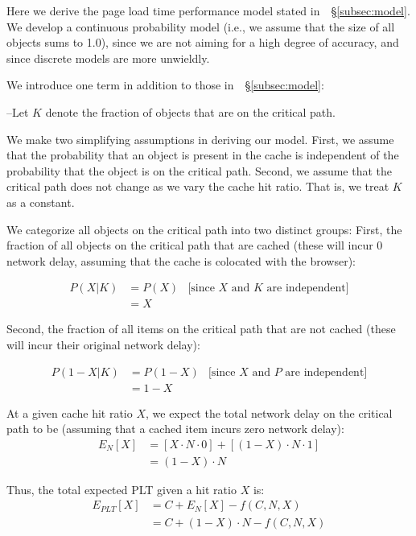 Here we derive the page load time performance model stated in~~\S\ref{subsec:model}. We
develop a continuous probability model (i.e., we assume that the size of all
objects sums to 1.0), since we are not aiming for a high degree of accuracy,
and since discrete models are more unwieldly.


We introduce one term in addition to those in~~\S\ref{subsec:model}:

\noindent--Let $K$ denote the fraction of objects that are on the critical path.

We make two simplifying assumptions in deriving our model. First, we assume that the probability that an
object is present in the cache is independent of the probability that the object is on the critical path.
Second, we assume that the critical path does not change as we vary the cache hit
ratio. That is, we treat $K$ as a constant.

We categorize all objects on the critical path into two distinct groups:
First, the fraction of all objects on the critical path that are cached (these
will incur 0 network delay, assuming that the cache is colocated with the
browser):

\begin{align*}
P(X|K) & =  P(X) & \text{[since $X$ and $K$ are independent]} \\
& = X &
\end{align*}

Second, the fraction of all items on the critical path that are not cached (these will incur their original network delay):

\begin{align*}
P(1-X | K) & = P(1-X) & \text{[since $X$ and $P$ are independent]} \\
& = 1-X &
\end{align*}

At a given cache hit ratio $X$, we expect the total network delay on the critical path to be (assuming that a cached item incurs zero network delay):
\begin{align*}
E_N[X] & = [X \cdot N \cdot 0] + [(1 - X) \cdot N \cdot 1] \\
& = (1 - X) \cdot N
\end{align*}

Thus, the total expected PLT given a hit ratio $X$ is:
\begin{align*}
E_{PLT}[X] & = C + E_N[X] - f(C,N,X) \\
& = C + (1 - X) \cdot N - f(C,N,X)
\end{align*}

